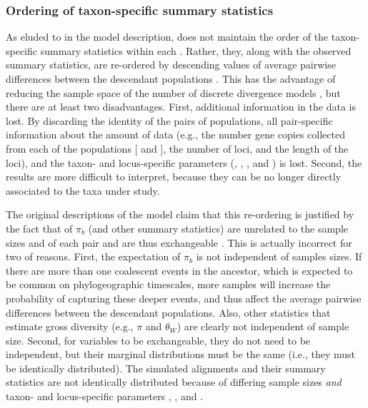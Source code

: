 \documentclass[letterpaper,12pt]{article}
\begin{document}
\begin{linenumbers}
\subsubsection*{Ordering of taxon-specific summary statistics}
As eluded to in the model description, \msb does not maintain the order of the
taxon-specific summary statistics \alignmentSS{}{} within each \ssVector{}.
Rather, they, along with the observed summary statistics, are re-ordered by
descending values of average pairwise differences between the descendant
populations \citep[$\pi_b$;][]{NeiLi1979,Huang2011}.
This has the advantage of reducing the sample space of the number of discrete
divergence models \divTimeMapVector, but there are at least two disadvantages.
First, additional information in the data is lost.
By discarding the identity of the \npairs{} pairs of populations, all
pair-specific information about the amount of data (e.g., the number gene
copies collected from each of the populations [ and
], the number of loci, and the length of the loci), and the
taxon- and locus-specific parameters (\hkyModel{}{},
\mutationRateScalarConstant{}{}, \ploidyScalar{}{}, and
\locusMutationRateScalar{}) is lost.
Second, the results are more difficult to interpret, because they can be no
longer directly associated to the taxa under study.

The original descriptions of the \msb model claim that this re-ordering is
justified by the fact that of $\pi_b$ (and other summary statistics) are
unrelated to the sample sizes  and  of
each pair and are thus exchangeable \citet{Hickerson2006,Huang2011}.
This is actually incorrect for two of reasons.
First, the expectation of $\pi_b$ is not independent of samples sizes.
If there are more than one coalescent events in the ancestor, which is expected
to be common on phylogeographic timescales, more samples will increase the
probability of capturing these deeper events, and thus affect the average
pairwise differences between the descendant populations.
Also, other statistics that estimate gross diversity (e.g., $\pi$ and
$\theta_W$) are clearly not independent of sample size.
Second, for variables to be exchangeable, they do not need to be independent,
but their marginal distributions must be the same (i.e., they must be
identically distributed).
The simulated alignments and their summary statistics are not identically
distributed because of differing sample sizes \emph{and} taxon- and
locus-specific parameters \hkyModel{}{}, \mutationRateScalarConstant{}{}, and
\ploidyScalar{}{}.


\end{linenumbers}
\end{document}

